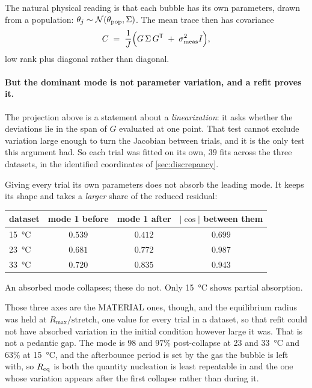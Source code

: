 \documentclass[10pt]{article}
\begin{document}
The natural physical reading is that each bubble has its own parameters, drawn from a
population: $\theta_j \sim \mathcal{N}(\theta_{\rm pop}, \Sigma)$. The mean trace then has
covariance
%
\begin{equation}
C \;=\; \frac{1}{J}\Big(G\,\Sigma\,G^{\mathsf T} \;+\; \sigma^2_{\rm meas} I\Big),
\label{eq:hierarchical}
\end{equation}
%
low rank plus diagonal rather than diagonal.

\paragraph{But the dominant mode is not parameter variation, and a refit proves it.}
The projection above is a statement about a \emph{linearization}: it asks whether the deviations
lie in the span of $G$ evaluated at one point. That test cannot exclude variation large enough
to turn the Jacobian between trials, and it is the only test this argument had. So each trial
was fitted on its own, $39$ fits across the three datasets, in the identified coordinates of
\cref{sec:discrepancy}.

Giving every trial its own parameters does not absorb the leading mode. It keeps its shape and
takes a \emph{larger} share of the reduced residual:

\begin{center}
\begin{tabular}{lccc}
\toprule
dataset & mode 1 before & mode 1 after & $\lvert\cos\rvert$ between them \\
\midrule
\SI{15}{\celsius} & $0.539$ & $0.412$ & $0.699$ \\
\SI{23}{\celsius} & $0.681$ & $\mathbf{0.772}$ & $\mathbf{0.987}$ \\
\SI{33}{\celsius} & $0.720$ & $\mathbf{0.835}$ & $\mathbf{0.943}$ \\
\bottomrule
\end{tabular}
\end{center}

\noindent An absorbed mode collapses; these do not. Only \SI{15}{\celsius} shows partial
absorption.

Those three axes are the MATERIAL ones, though, and the equilibrium radius was held at
$R_{\max}/\text{stretch}$, one value for every trial in a dataset, so that refit could not
have absorbed variation in the initial condition however large it was. That is not a pedantic
gap. The mode is $98$ and $97\%$ post-collapse at \SI{23}{} and \SI{33}{\celsius} and $63\%$ at
\SI{15}{\celsius}, and the afterbounce period is set by the gas the
bubble is left with, so $R_{\rm eq}$ is both the quantity nucleation is least repeatable in and
the one whose variation appears after the first collapse rather than during it.
\end{document}
